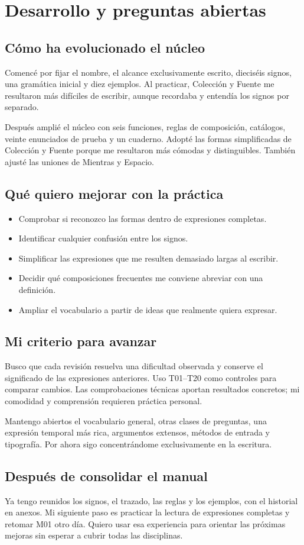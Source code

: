\section{Desarrollo y preguntas abiertas}
\subsection{Cómo ha evolucionado el núcleo}
Comencé por fijar el nombre, el alcance exclusivamente escrito, dieciséis
signos, una gramática inicial y diez ejemplos. Al practicar, Colección y Fuente
me resultaron más difíciles de escribir, aunque recordaba y entendía los signos
por separado.

Después amplié el núcleo con seis funciones, reglas de composición, catálogos,
veinte enunciados de prueba y un cuaderno. Adopté las formas simplificadas de
Colección y Fuente porque me resultaron más cómodas y distinguibles. También
ajusté las uniones de Mientras y Espacio.

\subsection{Qué quiero mejorar con la práctica}
\begin{itemize}
\item Comprobar si reconozco las formas dentro de expresiones completas.
\item Identificar cualquier confusión entre los signos.
\item Simplificar las expresiones que me resulten demasiado largas al escribir.
\item Decidir qué composiciones frecuentes me conviene abreviar con una definición.
\item Ampliar el vocabulario a partir de ideas que realmente quiera expresar.
\end{itemize}

\subsection{Mi criterio para avanzar}
Busco que cada revisión resuelva una dificultad observada y conserve el
significado de las expresiones anteriores. Uso T01--T20 como controles para
comparar cambios. Las comprobaciones técnicas aportan resultados concretos;
mi comodidad y comprensión requieren práctica personal.

Mantengo abiertos el vocabulario general, otras clases de preguntas, una
expresión temporal más rica, argumentos extensos, métodos de entrada y tipografía.
Por ahora sigo concentrándome exclusivamente en la escritura.

\subsection{Después de consolidar el manual}
Ya tengo reunidos los signos, el trazado, las reglas y los ejemplos, con el
historial en anexos. Mi siguiente paso es practicar la lectura de expresiones
completas y retomar M01 otro día. Quiero usar esa experiencia para orientar
las próximas mejoras sin esperar a cubrir todas las disciplinas.

